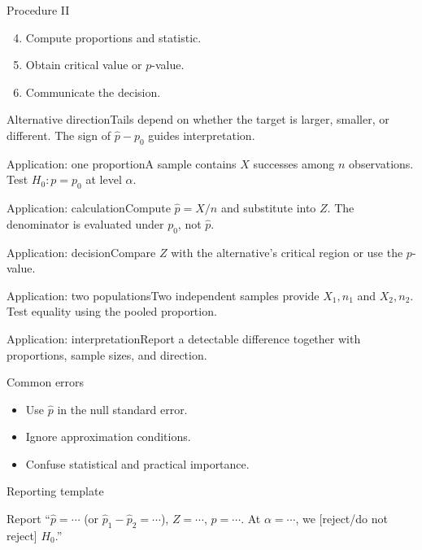 \documentclass[10pt,aspectratio=169]{beamer}
\begin{document}
\begin{frame}{Procedure II}\small\begin{enumerate}\setcounter{enumi}{3}\item Compute proportions and statistic.\item Obtain critical value or $p$-value.\item Communicate the decision.\end{enumerate}\end{frame}
\begin{frame}{Alternative direction}\small Tails depend on whether the target is larger, smaller, or different. The sign of $\hat p-p_0$ guides interpretation.\end{frame}
\begin{frame}{Application: one proportion}\small A sample contains $X$ successes among $n$ observations. Test $H_0:p=p_0$ at level $\alpha$.\end{frame}
\begin{frame}{Application: calculation}\small Compute $\hat p=X/n$ and substitute into $Z$. The denominator is evaluated under $p_0$, not $\hat p$.\end{frame}
\begin{frame}{Application: decision}\small Compare $Z$ with the alternative's critical region or use the $p$-value.\end{frame}
\begin{frame}{Application: two populations}\small Two independent samples provide $X_1,n_1$ and $X_2,n_2$. Test equality using the pooled proportion.\end{frame}
\begin{frame}{Application: interpretation}\small Report a detectable difference together with proportions, sample sizes, and direction.\end{frame}
\begin{frame}{Common errors}\small\begin{itemize}\item Use $\hat p$ in the null standard error.\item Ignore approximation conditions.\item Confuse statistical and practical importance.\end{itemize}\end{frame}
\begin{frame}{Reporting template}\small\begin{block}{Report} ``$\hat p=\cdots$ (or $\hat p_1-\hat p_2=\cdots$), $Z=\cdots$, $p=\cdots$. At $\alpha=\cdots$, we [reject/do not reject] $H_0$.''\end{block}\end{frame}
\end{document}
